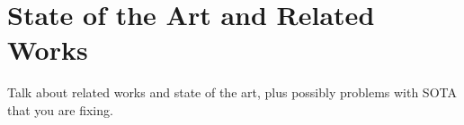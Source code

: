 \section{State of the Art and Related Works}\label{sec:sota}

Talk about related works and state of the art, plus possibly problems with
SOTA that you are fixing.

\lipsum[12-14]
